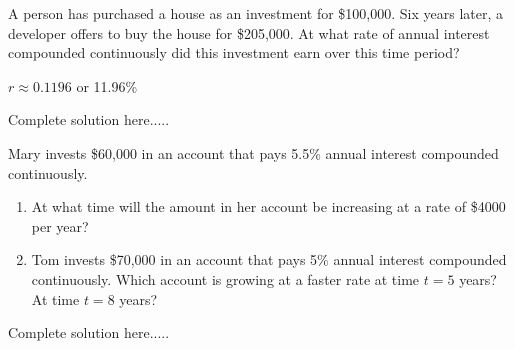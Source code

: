 \begin{example}
A person has purchased a house as an investment for \$100,000.  Six years later, a developer offers to buy the house for \$205,000.  At what rate of annual interest compounded continuously did this investment earn over this time period?  

    \begin{sol}
    $r\approx 0.1196$ or 11.96\%
    \end{sol}
    \begin{solL}
    Complete solution here.....
    
    \end{solL}
    
\end{example}
\newpage
\begin{example}
Mary invests \$60,000 in an account that pays 5.5\% annual interest compounded continuously.
\renewcommand{\labelenumi}{\textbf{(\alph{enumi})}}
\begin{enumerate}[leftmargin=*]
\item At what time will the amount in her account be increasing at a rate of \$4000 per year? 
\item Tom invests \$70,000 in an account that pays 5\% annual interest compounded continuously.  Which account is growing at a faster rate at time $t=5$ years?  At time $t=8$ years? 
\end{enumerate}
    \begin{sol}
    \end{sol}
    \begin{solL}
    Complete solution here.....
    
    \end{solL}
    
\end{example}

